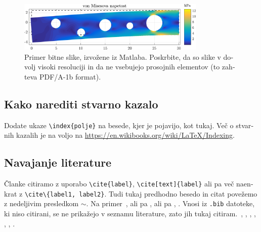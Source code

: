 \documentclass[12pt,a4paper,twoside]{article}
\newcommand{\literatura}{literatura}  %
\theoremstyle{definition} %
\theoremstyle{plain} %
\numberwithin{equation}{section}  %
\begin{document}
\begin{otherlanguage}{slovene}
\begin{figure}[h]
  \centering
  \includegraphics[width=0.8\textwidth]{images/image.png}
  \caption[Primer bitne slike.]{Primer bitne slike, izvožene iz Matlaba. Poskrbite, da so slike v
  dovolj visoki resoluciji in da ne vsebujejo prosojnih elementov (to zahteva PDF/A-1b format).}
  \label{fig:image}
\end{figure}

\subsection{Kako narediti stvarno kazalo}
Dodate ukaze \verb|\index{polje}| na besede, kjer je pojavijo, kot tukaj.
Več o stvarnih kazalih je na voljo na \url{https://en.wikibooks.org/wiki/LaTeX/Indexing}.

\subsection{Navajanje literature}
Članke citiramo z uporabo \verb|\cite{label}|, \verb|\cite[text]{label}| ali pa več naenkrat z
\verb|\cite\{label1, label2}|. Tudi tukaj predhodno besedo in citat povežemo z nedeljivim presledkom
$\sim$. Na primer~\cite{chen2006meshless,liu2001point}, ali pa \cite{kibriya2007empirical}, ali pa
\cite[str.\ 12]{trobec2015parallel}, \cite[enačba (2.3)]{pereira2016convergence}.
Vnosi iz \verb|.bib| datoteke, ki niso citirani, se ne prikažejo v seznamu literature, zato jih
tukaj citiram.~\cite{vene2000categorical}, \cite{gregoric2017stopniceni}, \cite{slak2015induktivni},
\cite{nsphere}, \cite{kearsley1975linearly}, \cite{STtemplate}, \cite{NunbergerTand}.

\end{otherlanguage}

\cleardoublepage                           %

\cleardoublepage                           %
\printindex
\end{document}
